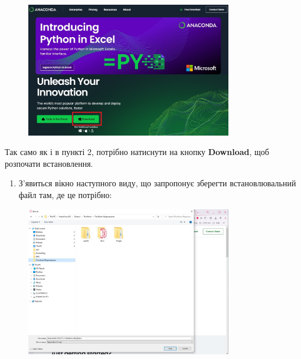 \documentclass[
  letterpaper,
]{report}
\providecommand{\tightlist}{%
  \setlength{\itemsep}{0pt}\setlength{\parskip}{0pt}}\usepackage{longtable,booktabs,array}
\begin{document}
\begin{figure}

{\centering \includegraphics[width=0.8\textwidth,height=\textheight]{Images/ap1/Screenshot_4.jpg}

}

\end{figure}

Так само як і в пункті 2, потрібно натиснути на кнопку
\textbf{Download}, щоб розпочати встановлення.

\begin{enumerate}
\def\labelenumi{\arabic{enumi}.}
\setcounter{enumi}{3}
\tightlist
\item
  З'явиться вікно наступного виду, що запропонує зберегти
  встановлювальний файл там, де це потрібно:
\end{enumerate}

\begin{figure}

{\centering \includegraphics[width=0.8\textwidth,height=\textheight]{Images/ap1/Screenshot_5.jpg}

}

\end{figure}
\end{document}
